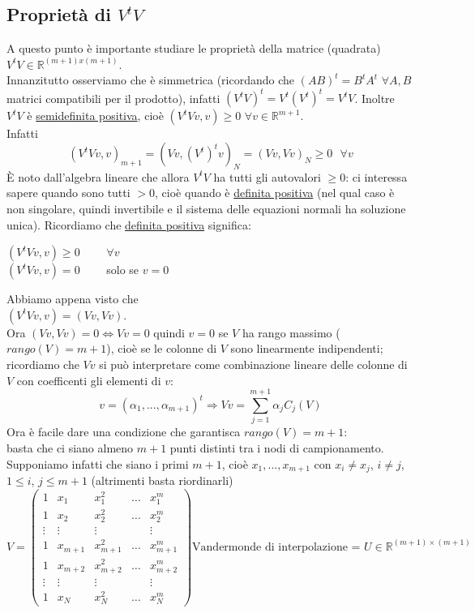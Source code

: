 \documentclass[12pt,a4paper]{article}
\begin{document}
\subsection{Proprietà di $V^tV$}
A questo punto è importante studiare le proprietà della matrice (quadrata) $V^tV\in\mathbb{R}^{(m+1)x(m+1)}$.\\Innanzitutto osserviamo che è simmetrica (ricordando che $(AB)^t=B^tA^t$ $\forall A,B$ matrici compatibili per il prodotto), infatti $(V^t V)^t=V^t(V^t)^t=V^tV$. Inoltre $V^tV$ è \uline{semidefinita positiva}, cioè $(V^tVv,v)\geq0$ $\forall v\in\mathbb{R}^{m+1}$.\\ Infatti
\begin{equation*}
    (V^tVv,v)_{m+1}=(Vv,(V^t)^tv)_N=(Vv,Vv)_N\geq0\  \  \  \forall v
\end{equation*}
È noto dall'algebra lineare che allora $V^tV$ ha tutti gli autovalori $\geq0$: ci interessa sapere quando sono tutti $>0$, cioè quando è \uline{definita positiva} (nel qual caso è non singolare, quindi invertibile e il sistema delle equazioni normali ha soluzione unica). Ricordiamo che \uline{definita positiva} significa:
\begin{center}
     $(V^tVv,v)\geq0$ \  \  \   \   $\forall v$   \\
     $(V^tVv,v)=0$  \  \  \  \   solo se $v=0$
\end{center}
Abbiamo appena visto che\\
$(V^tVv,v)=(Vv,Vv)$.\\Ora $(Vv,Vv)=0 \iff Vv=0$ quindi $v=0$ se $V$ ha rango massimo ($rango(V)=m+1$), cioè se le colonne di $V$ sono linearmente indipendenti; ricordiamo che $Vv$ si può interpretare come combinazione lineare delle colonne di $V$ con coefficenti gli elementi di $v$:
\begin{equation*}
    v=(\alpha_1,...,\alpha_{m+1})^t\Rightarrow Vv=\sum_{j=1}^{m+1}\alpha_jC_j(V)
\end{equation*}
Ora è facile dare una condizione che garantisca $rango(V)=m+1$:\\
basta che ci siano almeno $m+1$ punti distinti tra i nodi di campionamento.\\Supponiamo infatti che siano i primi $m+1$, cioè $x_1,...,x_{m+1}$ con $x_i\neq x_j$, $i\neq j$, $1\leq i$, $j\leq m+1$ (altrimenti basta riordinarli)
\[
    V = 
\begin{pmatrix}
1 & x_1 & x_1^2 & \dotso & x_1^m \\
1 & x_2 & x_2^2 & \dotso & x_2^m \\
\vdots & \vdots & \vdots & & \vdots \\
1 & x_{m+1} & x_{m+1}^2 & \dotso & x_{m+1}^m \\
1 & x_{m+2} & x_{m+2}^2 & \dotso & x_{m+2}^m \\
\vdots & \vdots & \vdots & & \vdots \\
1 & x_N & x_N^2 & \dotso & x_N^m
\end{pmatrix}
\text{Vandermonde di interpolazione = } U \in \mathbb{R}^{(m+1) \times (m+1)}
\]
\end{document}
